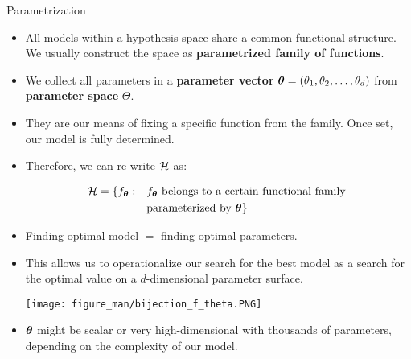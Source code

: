 \documentclass[11pt,compress,t,notes=noshow, xcolor=table]{beamer}
\begin{document}
\begin{vbframe}{Parametrization}

\begin{itemize}
  
  \item All models within a hypothesis space share a common functional 
  structure. We usually construct the space as 
  \textbf{parametrized family of functions}.
  
  
  \item We collect all parameters in a \textbf{parameter vector} 
  $\bm{\theta} = (\theta_1, \theta_2, \ldots, \theta_d)$ from \textbf{parameter space} 
  $\Theta$.
  
  \item They are our means of fixing a specific function from the family. 
      Once set, our model is fully determined.
  
  \item Therefore, we can re-write $\mathcal{H}$ as:

  \begin{equation*}
    \begin{split}
      \mathcal{H} = \{f_{\bm{\theta}}: \quad & f_{\bm{\theta}} \text{ belongs to a certain
       functional family } \\
       & \text{parameterized by } \bm{\theta}\}
    \end{split}
  \end{equation*}
  
  
  \framebreak
  
  \item Finding optimal model $=$ 
  finding optimal parameters.
  
  \item This allows us to operationalize our search
  for the best model as a search for the optimal value on a $d$-dimensional
  parameter surface.
  
  \begin{center}
    \texttt{[image: figure\_man/bijection\_f\_theta.PNG]} 
  \end{center}
  
  \item $\bm{\theta}$ might be scalar or very high-dimensional with thousands of parameters,
  depending on the complexity of our model.
  


\end{itemize}
\end{vbframe}
\end{document}
